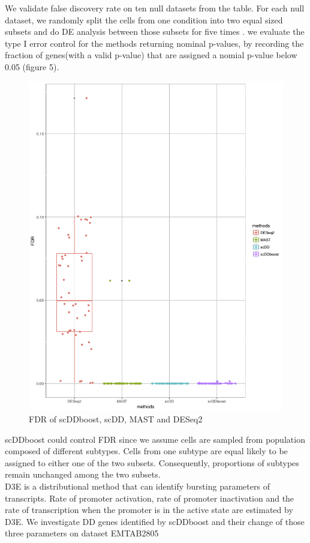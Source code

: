 \documentclass[11pt]{amsart}
\begin{document}
\newpage
We validate false discovery rate on ten null datasets from the table. For each null dataset, we randomly split the cells from one condition into two equal sized subsets and do DE analysis between those subsets for five times . we evaluate the type I error control for the methods returning nominal p-values, by recording the fraction of genes(with a valid p-value) that are assigned a nomial p-value below 0.05 (figure 5).\\
\begin{figure}[H]
\includegraphics[scale = 0.3]{FDR.png}
 \caption{FDR of scDDboost, scDD, MAST and DESeq2}
  \label{fig:6}
\end{figure}
scDDboost could control FDR since we assume cells are sampled from population composed of different subtypes. Cells from one subtype are equal likely to be assigned to either one of the two subsets. Consequently, proportions of subtypes remain unchanged among the two subsets.\\
D3E\cite{ref:d3e} is a distributional method that can identify bursting parameters of transcripts. Rate of promoter activation, rate of promoter inactivation and the rate of transcription when the promoter is in the active state are estimated by D3E.  We investigate DD genes identified by scDDboost and their change of those three parameters on dataset EMTAB2805\\
\end{document}
